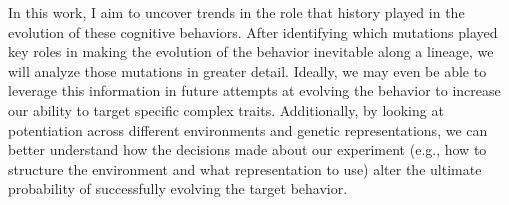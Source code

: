 
In this work, I aim to uncover trends in the role that history played in the evolution of these cognitive behaviors. 
After identifying which mutations played key roles in making the evolution of the behavior inevitable along a lineage, we will analyze those mutations in greater detail.
Ideally, we may even be able to leverage this information in future attempts at evolving the behavior to increase our ability to target specific complex traits. 
Additionally, by looking at potentiation across different environments and genetic representations, we can better understand how the decisions made about our experiment (e.g., how to structure the environment and what representation to use) alter the ultimate probability of successfully evolving the target behavior. 